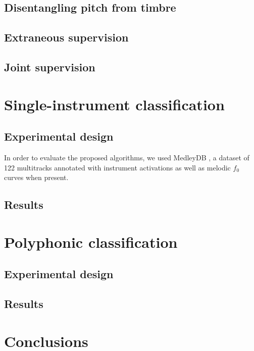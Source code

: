 \documentclass{article}
\begin{document}
\subsection{Disentangling pitch from timbre}

\subsection{Extraneous supervision}

\subsection{Joint supervision}


\section{Single-instrument classification}\label{sec:single-instrument}
\subsection{Experimental design}
In order to evaluate the proposed algorithms, we used MedleyDB \cite{Bittner2014}, a dataset of 122 multitracks annotated with instrument activations as well as melodic $f_0$ curves when present. 

\subsection{Results}


\section{Polyphonic classification}\label{sec:polyphonic}
\subsection{Experimental design}

\subsection{Results}


\section{Conclusions}


\end{document}
